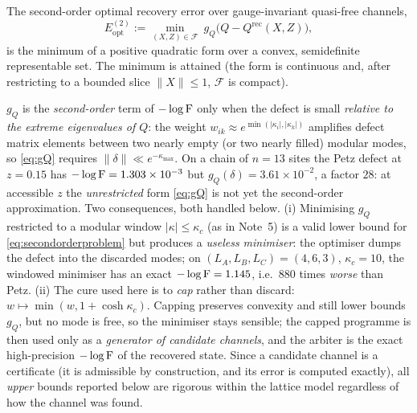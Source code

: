 \documentclass[11pt]{article}
\newcommand{\Erec}{E_{\mathrm{opt}}}
\begin{document}
\begin{corollary}\label{cor:convexQP}
The second-order optimal recovery error over gauge-invariant quasi-free channels,
\begin{equation}\label{eq:secondorderproblem}
 \Erec^{(2)}:=\min_{(X,Z)\in\mathcal F}\ g_Q\bigl(Q-Q^{\mathrm{rec}}(X,Z)\bigr),
\end{equation}
is the minimum of a positive quadratic form over a convex, semidefinite
representable set.  The minimum is attained (the form is continuous and, after
restricting to a bounded slice \(\|X\|\le1\), \(\mathcal F\) is compact).
\end{corollary}

\begin{verdictgap}
\(g_Q\) is the \emph{second-order} term of \(-\log\operatorname{F}\) only when the defect is
small \emph{relative to the extreme eigenvalues of \(Q\)}: the weight
\(w_{ik}\approx e^{\min(|\kappa_i|,|\kappa_k|)}\) amplifies defect matrix elements
between two nearly empty (or two nearly filled) modular modes, so
\eqref{eq:gQ} requires \(\|\delta\|\ll e^{-\kappa_{\max}}\).  On a chain of
\(n=13\) sites the Petz defect at \(z=0.15\) has
\(-\log\operatorname{F}=1.303\times10^{-3}\) but \(g_Q(\delta)=3.61\times10^{-2}\), a factor
\(28\): at accessible \(z\) the \emph{unrestricted} form \eqref{eq:gQ} is not yet
the second-order approximation.  Two consequences, both handled below.
(i) Minimising \(g_Q\) restricted to a modular window \(|\kappa|\le\kappa_c\)
(as in Note~5) is a valid lower bound for \eqref{eq:secondorderproblem} but
produces a \emph{useless minimiser}: the optimiser dumps the defect into the
discarded modes; on \((L_A,L_B,L_C)=(4,6,3)\), \(\kappa_c=10\), the windowed
minimiser has an exact \(-\log\operatorname{F}=1.145\), i.e.\ \(880\) times \emph{worse} than
Petz.  (ii) The cure used here is to \emph{cap} rather than discard:
\(w\mapsto\min(w,1+\cosh\kappa_c)\).  Capping preserves convexity and still lower
bounds \(g_Q\), but no mode is free, so the minimiser stays sensible; the capped
programme is then used only as a \emph{generator of candidate channels}, and the
arbiter is the exact high-precision \(-\log\operatorname{F}\) of the recovered state.  Since
a candidate channel is a certificate (it is admissible by construction, and its
error is computed exactly), all \emph{upper} bounds reported below are rigorous
within the lattice model regardless of how the channel was found.
\end{verdictgap}
\end{document}
